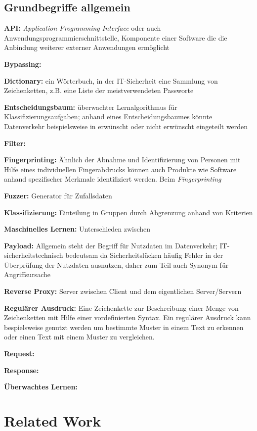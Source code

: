 \subsection{Grundbegriffe allgemein}

\textbf{API:} \emph{Application Programming Interface} oder auch Anwendungsprogrammierschnittstelle, Komponente einer Software die die Anbindung weiterer externer Anwendungen ermöglicht

\textbf{Bypassing:}

\textbf{Dictionary:} ein Wörterbuch, in der IT-Sicherheit eine Sammlung von Zeichenketten, z.B. eine Liste der meistverwendeten Passworte

\textbf{Entscheidungsbaum:} überwachter Lernalgorithmus für Klassifizierungsaufgaben; anhand eines Entscheidungsbaumes könnte Datenverkehr beispielsweise in erwünscht oder nicht erwünscht eingeteilt werden

\textbf{Filter:}

\textbf{Fingerprinting:} Ähnlich der Abnahme und Identifizierung von Personen mit Hilfe eines individuellen Fingerabdrucks können auch Produkte wie Software anhand spezifischer Merkmale identifiziert werden. Beim \emph{Fingerprinting}

\textbf{Fuzzer:} Generator für Zufallsdaten

\textbf{Klassifizierung:} Einteilung in Gruppen durch Abgrenzung anhand von Kriterien

\textbf{Maschinelles Lernen:} Unterschieden zwischen 

\textbf{Payload:} Allgemein steht der Begriff für Nutzdaten im Datenverkehr; IT-sicherheitstechnisch bedeutsam da Sicherheitslücken häufig Fehler in der Überprüfung der Nutzdaten ausnutzen, daher zum Teil auch Synonym für Angriffsursache

\textbf{Reverse Proxy:} Server zwischen Client und dem eigentlichen Server/Servern 

\textbf{Regulärer Ausdruck:} Eine Zeichenkette zur Beschreibung einer Menge von Zeichenketten mit Hilfe einer vordefinierten Syntax. Ein regulärer Ausdruck kann bespielsweise genutzt werden um bestimmte Muster in einem Text zu erkennen oder einen Text mit einem Muster zu vergleichen.

\textbf{Request:} 

\textbf{Response:}

\textbf{Überwachtes Lernen:} 

\section{Related Work} %

